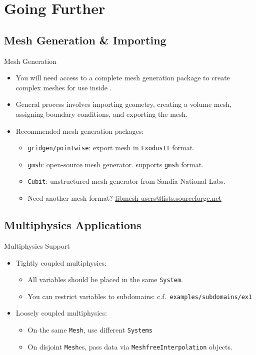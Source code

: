 \section{Going Further}

\subsection{Mesh Generation \& Importing}
\frame
{
  \begin{block}{Mesh Generation}
    \begin{itemize}
      \item You will need access to a complete mesh generation package to create complex meshes for use inside \libMesh{}.
      \item General process involves importing geometry, creating a volume mesh, assigning boundary conditions, and exporting the mesh.
      \item Recommended mesh generation packages:
        \begin{itemize}
          \item \texttt{gridgen/pointwise}: export mesh in \texttt{ExodusII} format.
          \item \texttt{gmsh}: open-source mesh generator. \libMesh{} supports \texttt{gmsh} format.
          \item \texttt{Cubit}: unstructured mesh generator from Sandia National Labs.
          \item Need another mesh format? \url{libmesh-users@lists.sourceforge.net}
        \end{itemize}
    \end{itemize}
  \end{block}
}


\subsection{Multiphysics Applications}
\frame
{
  \begin{block}{Multiphysics Support}
    \begin{itemize}
      \item Tightly coupled multiphysics:
        \begin{itemize}
          \item All variables should be placed in the same \texttt{System}.
          \item You can restrict variables to subdomains: c.f.\ \texttt{examples/subdomains/ex1}
        \end{itemize}
        \item Loosely coupled multiphysics:
          \begin{itemize}
            \item On the same \texttt{Mesh}, use different \texttt{Systems}
            \item On disjoint \texttt{Mesh}es, pass data via \texttt{MeshfreeInterpolation} objects.
          \end{itemize}
    \end{itemize}
  \end{block}
}



